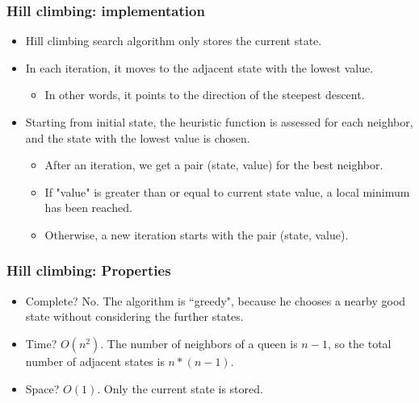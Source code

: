 \documentclass{beamer}
\begin{document}
    \begin{frame}
    \frametitle{Hill climbing: implementation}
        \begin{itemize}
            \item Hill climbing search algorithm only stores the current state.
            \pause
            \item In each iteration, it moves to the adjacent state with the lowest value.
            \pause
            \begin{itemize}
                \item In other words, it points to the direction of the steepest descent.
            \end{itemize}
            \pause
            \item Starting from initial state, the heuristic function is assessed for each neighbor, and the state with the lowest value is chosen.
            \pause
            \begin{itemize}
                \item After an iteration, we get a pair (state, value) for the best neighbor.
                \pause
                \item If "value" is greater than or equal to current state value, a local minimum has been reached.
                \pause
                \item Otherwise, a new iteration starts with the pair (state, value).
            \end{itemize} 
        \end{itemize}
    \end{frame}

    \begin{frame}
    \frametitle{Hill climbing: Properties}
     \begin{itemize}
         \item Complete? \pause No.
         \pause The algorithm is ``greedy", because he chooses a nearby good state without considering the further states.
         \pause
         \item Time? \pause 
         \begin{math}O(n^2).\end{math}
         \pause The number of neighbors of a queen is \begin{math}n-1\end{math}, so the total number of adjacent states is \begin{math}n * (n-1)\end{math}.
         \pause
         \item Space? \pause
         \begin{math}O(1).\end{math}
         \pause Only the current state is stored.
     \end{itemize}   
    \end{frame}
\end{document}
